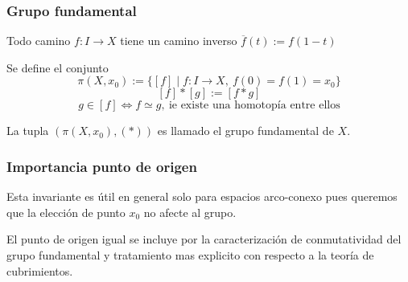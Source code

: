 \documentclass[xetex,mathserif,serif]{beamer}
\begin{document}
  \begin{frame}
    \frametitle{Grupo fundamental}
    \begin{block}{}
      Todo camino \(f : I \to X\) tiene un camino inverso \(\overline f (t)
      := f( 1 - t)\)
    \end{block}
    \begin{block}{}
      Se define el conjunto
      \[ \pi (X, x_0) := \{ [f] \mid f : I \to X ,\ f(0) = f(1) = x_0
        \} \]
      \[ [f] * [g] := [f * g]\]
      \[ g \in [f] \iff f \simeq g ,\ \text{ie existe una homotopía
          entre ellos}\]
    \end{block}

    \begin{block}{}
      La tupla \(
      \left(\pi(X, x_0), (*) \right) \) es llamado el grupo fundamental de \(X\).
    \end{block}
  \end{frame}

  \begin{frame}
    \frametitle{Importancia punto de origen}
    \begin{block}{}
      Esta invariante es útil en general solo para espacios arco-conexo
      pues queremos que la elección de punto \(x_0\) no afecte al grupo. \\

      \centering
    \end{block}

    \pause

    \begin{block}{}
      El punto de origen igual se incluye por la caracterización de
      conmutatividad del grupo fundamental y tratamiento mas explicito con
      respecto a la teoría de cubrimientos.
    \end{block}
  \end{frame}
\end{document}
